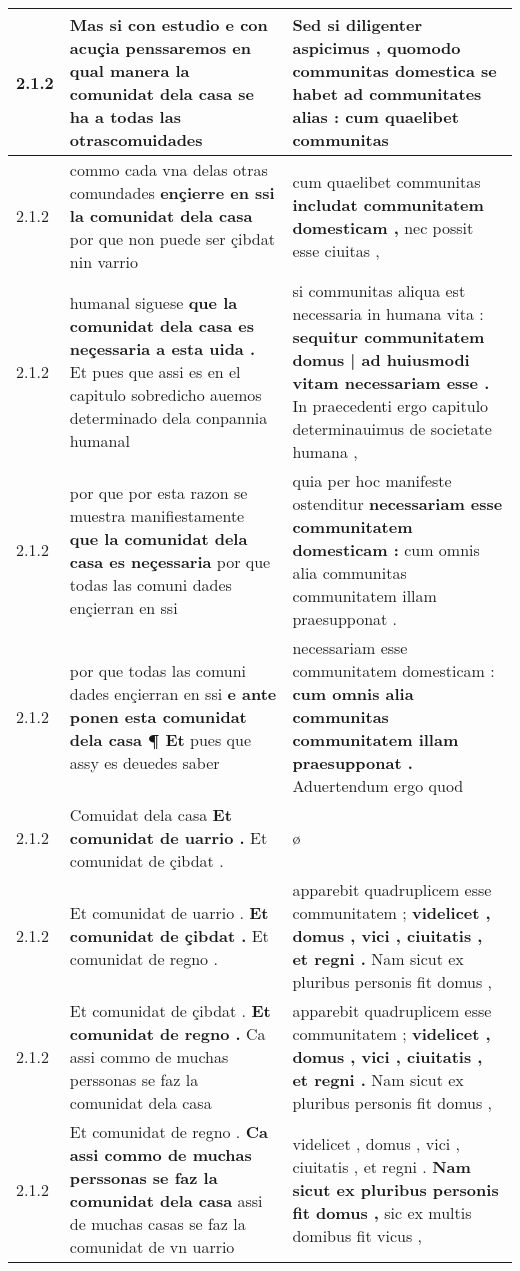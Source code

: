 \begin{tabular}{|p{1cm}|p{6.5cm}|p{6.5cm}|}
2.1.2 & Mas si con estudio e con acuçia penssaremos \textbf{ en qual manera la comunidat dela casa se ha a todas las } otrascomuidades & Sed si diligenter aspicimus , \textbf{ quomodo communitas domestica se habet ad communitates alias : } cum quaelibet communitas \\\hline
2.1.2 & commo cada vna delas otras comundades \textbf{ ençierre en ssi la comunidat dela casa } por que non puede ser çibdat nin varrio & cum quaelibet communitas \textbf{ includat communitatem domesticam , } nec possit esse ciuitas , \\\hline
2.1.2 & humanal siguese \textbf{ que la comunidat dela casa es neçessaria a esta uida . } Et pues que assi es en el capitulo sobredicho auemos determinado dela conpannia humanal & si communitas aliqua est necessaria in humana vita : \textbf{ sequitur communitatem domus | ad huiusmodi vitam necessariam esse . } In praecedenti ergo capitulo determinauimus de societate humana , \\\hline
2.1.2 & por que por esta razon se muestra manifiestamente \textbf{ que la comunidat dela casa es neçessaria } por que todas las comuni dades ençierran en ssi & quia per hoc manifeste ostenditur \textbf{ necessariam esse communitatem domesticam : } cum omnis alia communitas communitatem illam praesupponat . \\\hline
2.1.2 & por que todas las comuni dades ençierran en ssi \textbf{ e ante ponen esta comunidat dela casa ¶ Et } pues que assy es deuedes saber & necessariam esse communitatem domesticam : \textbf{ cum omnis alia communitas communitatem illam praesupponat . } Aduertendum ergo quod \\\hline
2.1.2 & Comuidat dela casa \textbf{ Et comunidat de uarrio . } Et comunidat de çibdat . & ø \\\hline
2.1.2 & Et comunidat de uarrio . \textbf{ Et comunidat de çibdat . } Et comunidat de regno . & apparebit quadruplicem esse communitatem ; \textbf{ videlicet , domus , vici , ciuitatis , et regni . } Nam sicut ex pluribus personis fit domus , \\\hline
2.1.2 & Et comunidat de çibdat . \textbf{ Et comunidat de regno . } Ca assi commo de muchas perssonas se faz la comunidat dela casa & apparebit quadruplicem esse communitatem ; \textbf{ videlicet , domus , vici , ciuitatis , et regni . } Nam sicut ex pluribus personis fit domus , \\\hline
2.1.2 & Et comunidat de regno . \textbf{ Ca assi commo de muchas perssonas se faz la comunidat dela casa } assi de muchas casas se faz la comunidat de vn uarrio & videlicet , domus , vici , ciuitatis , et regni . \textbf{ Nam sicut ex pluribus personis fit domus , } sic ex multis domibus fit vicus , \\\hline

\end{tabular}
